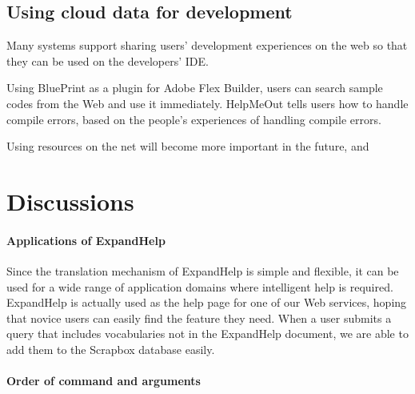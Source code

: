 \documentclass{sigchi}
\def\SB{\textsf{Scrapbox}}
\def\EH{\textsf{ExpandHelp}}
\begin{document}
\subsection{Using cloud data for development}


Many systems support sharing users' development experiences on the web so that
they can be used on the developers' IDE.

Using BluePrint\cite{Brandt:2010:EPI:1753326.1753402}
as a plugin for Adobe Flex Builder,
users can search sample codes from the Web and use it immediately.
%
HelpMeOut\cite{Hartmann:2010:OPS:1753326.1753478} tells users
how to handle compile errors,
based on the people's experiences of handling compile errors.

Using resources on the net will become more important
in the future, and 


% 
% 
% 

\section{Discussions}

\paragraph{Applications of {\EH}}

Since the translation mechanism of {\EH} is simple and flexible,
it can be used for a wide range of application domains where
intelligent help is required.
{\EH} is actually used as the help page for
one of our Web services, hoping that
novice users can easily find the feature they need.
When a user submits a query that includes vocabularies
not in the {\EH} document,
we are able to add them to the {\SB} database easily.

\paragraph{Order of command and arguments}
\end{document}
